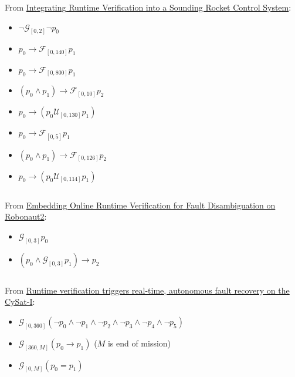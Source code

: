 \documentclass{article}
\newcommand{\FF}{\mathcal{F}}
\newcommand{\GG}{\mathcal{G}}
\newcommand{\UU}{\mathcal{U}}
\begin{document}
From \href{https://link.springer.com/chapter/10.1007/978-3-030-76384-8_10}{Integrating Runtime Verification into a Sounding Rocket Control System}:
\begin{itemize}
    \item $\neg \GG_{[0,2]} \neg p_0$
    \item $p_0 \rightarrow \FF_{[0,140]}p_1$
    \item $p_0 \rightarrow \FF_{[0,800]}p_1$
    \item $(p_0 \land p_1) \rightarrow \FF_{[0,10]}p_2$
    \item $p_0 \rightarrow (p_0 \UU_{[0,130]} p_1)$
    \item $p_0 \rightarrow \FF_{[0,5]} p_1$
    \item $(p_0 \land p_1) \rightarrow \FF_{[0, 126]} p_2$
    \item $p_0 \rightarrow (p_0 \UU_{[0,114]} p_1)$
\end{itemize}
$$$$

From \href{https://link.springer.com/chapter/10.1007/978-3-030-57628-8_12}{Embedding Online Runtime Verification for Fault Disambiguation on Robonaut2}:
\begin{itemize}
    \item $\GG_{[0,3]}p_0$
    \item $(p_0 \land \GG_{[0,3]}p_1) \rightarrow p_2$
\end{itemize}
$$$$

From \href{https://link.springer.com/chapter/10.1007/978-3-031-06773-0_45}{
Runtime verification triggers real-time, autonomous fault recovery on the CySat-I}:
\begin{itemize}
    \item $\GG_{[0,360]}(\neg p_0 \land \neg p_1 \land \neg p_2 \land \neg p_3 \land \neg p_4 \land \neg p_5)$
    \item $\GG_{[360, M]}(p_0 \rightarrow p_1)$ ($M$ is end of mission)
    \item $\GG_{[0, M]}(p_0 = p_1)$
\end{itemize}
$$$$
\end{document}
